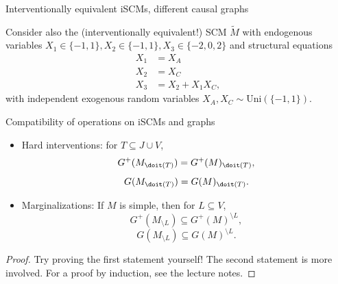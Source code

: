 \begin{frame}{Interventionally equivalent iSCMs, different causal graphs}
\begin{Eg}
  Consider also the (interventionally equivalent!) SCM $\tilde{M}$ with endogenous variables $X_1 \in \{-1,1\}, X_2 \in \{-1,1\}, X_3 \in \{-2,0,2\}$ and structural equations
$$
  \begin{aligned} 
    X_1 &= X_A \\
    X_2 &= X_C \\
    X_3 &= X_2 + X_1 X_C,
  \end{aligned} 
$$
with independent exogenous random variables $X_A,X_C \sim \mathrm{Uni}(\{-1,1\})$.
  \begin{center}
  \end{center}
\end{Eg}
\end{frame}

\begin{frame}{Compatibility of operations on iSCMs and graphs}
  \begin{Prp}[\ref{prp:compatibility_graph}]
  \begin{itemize}
    \item Hard interventions: for $T \subseteq J \cup V$,
      $$G^+(M_{\doit(T)}) = G^+(M)_{\doit(T)},$$
      $$G(M_{\doit(T)}) = G(M)_{\doit(T)}.$$
    \item Marginalizations: If $M$ is simple, then for $L \subseteq V$,
      $$G^+(M_{\setminus L}) \subseteq G^+(M)^{\setminus L},$$
      $$G(M_{\setminus L}) \subseteq G(M)^{\setminus L}.$$
  \end{itemize}
\end{Prp}
\begin{proof}
Try proving the first statement yourself!
The second statement is more involved. For a proof by induction, see the lecture notes.
\end{proof}
\end{frame}

